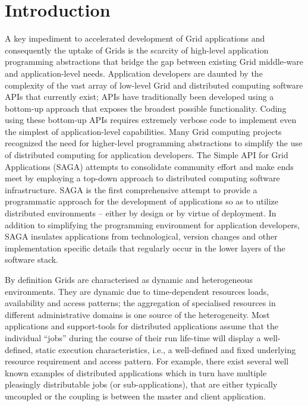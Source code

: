 \documentclass[conference,final]{IEEEtran}
\begin{document}
\section{Introduction}

A key impediment to accelerated development of Grid applications and
consequently the uptake of Grids is the scarcity of high-level
application programming abstractions that bridge the gap between
existing Grid middle-ware and application-level needs.  Application
developers are daunted by the complexity of the vast array of
low-level Grid and distributed computing software APIs that currently
exist; APIs have traditionally been developed using a bottom-up
approach that exposes the broadest possible functionality.  Coding
using these bottom-up APIs requires extremely verbose code to
implement even the simplest of application-level capabilities.  Many
Grid computing projects~\cite{gat, cog, realitygrid} recognized the
need for higher-level programming abstractions to simplify the use of
distributed computing for application developers.  The Simple API for
Grid Applications (SAGA) attempts to consolidate community effort and
make ends meet by employing a top-down approach to distributed
computing software infrastructure.  SAGA is the first comprehensive
attempt to provide a programmatic approach for the development of
applications so as to utilize distributed environments -- either by
design or by virtue of deployment.  In addition to simplifying the
programming environment for application developers, SAGA insulates
applications from technological, version changes and other
implementation specific details that regularly occur in the lower
layers of the software stack.

By definition Grids are characterised as dynamic and heterogeneous
environments.  They are dynamic due to time-dependent resources loads,
availability and access patterns; the aggregation of specialised
resources in different administrative domains is one source of the
heterogeneity.  Most applications and support-tools for distributed
applications assume that the individual ``jobs'' during the course of
their run life-time will display a well-defined, static execution
characteristics, i.e., a well-defined and fixed underlying resource
requirement and access pattern.  For example, there exist several well
known examples of distributed applications which in turn have multiple
pleasingly distributable jobs (or sub-applications), that are either
typically uncoupled or the coupling is between the master and client
application.
\end{document}
